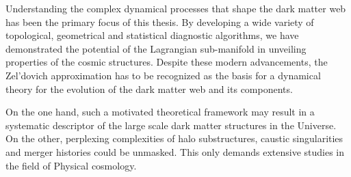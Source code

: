 Understanding the complex dynamical processes that shape the dark matter web has been the primary focus of this thesis. By developing a wide variety of topological, geometrical and statistical diagnostic algorithms, we have demonstrated the potential of the Lagrangian sub-manifold in unveiling properties of the cosmic structures. Despite these modern advancements, the Zel'dovich approximation has to be recognized as the basis for a dynamical theory for the evolution of the dark matter web and its components. 

On the one hand, such a motivated theoretical framework may result in a systematic descriptor of the large scale dark matter structures in the Universe. On the other, perplexing complexities of halo substructures, caustic singularities and merger histories could be unmasked. This only demands extensive studies in the field of Physical cosmology.   



